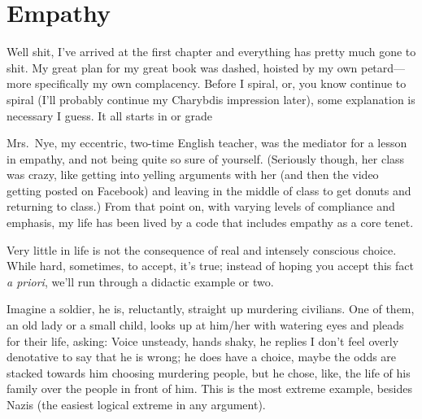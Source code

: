 \documentclass[../butidigress.tex]{subfiles}
\begin{document}
\chapter{Empathy}\label{chap:empathy}
\newpage

Well shit, I've arrived at the first chapter and everything has pretty much gone to shit.
My great plan for my great book was dashed, hoisted by my own petard---more specifically my own complacency.
Before I spiral, or, you know continue to spiral (I'll probably continue my Charybdis impression later), some explanation is necessary I guess.
It all starts in  or  grade\lips{}

Mrs.\ Nye, my eccentric, two-time English teacher, was the mediator for a lesson in empathy, and not being quite so sure of yourself.
(Seriously though, her class was crazy, like getting into yelling arguments with her (and then the video getting posted on Facebook) and leaving in the middle of class to get donuts and returning to class.)
From that point on, with varying levels of compliance and emphasis, my life has been lived by a code that includes empathy as a core tenet.

Very little in life is not the consequence of real and intensely conscious choice.
While hard, sometimes, to accept, it's true; instead of hoping you accept this fact \textit{a priori}, we'll run through a didactic example or two.

Imagine a soldier, he is, reluctantly, straight up murdering civilians.
One of them, an old lady or a small child, looks up at him/her with watering eyes and pleads for their life, asking: 
Voice unsteady, hands shaky, he replies 
I don't feel overly denotative to say that he is wrong; he does have a choice, maybe the odds are stacked towards him choosing murdering people, but he chose, like, the life of his family over the people in front of him.
This is the most extreme example, besides Nazis (the easiest logical extreme in any argument).
\end{document}
